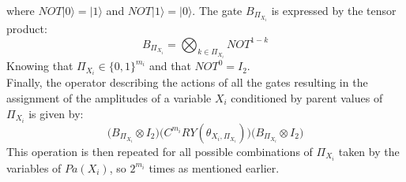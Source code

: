 where $NOT|0\rangle = |1\rangle$ and $NOT|1\rangle = |0\rangle$. 
The gate $B_{\Pi_{X_i}}$ is expressed by the tensor product:
\[B_{\Pi_{X_i}} = \bigotimes_{k \in \Pi_{X_i}} NOT^{1-k} \]
Knowing that $\Pi_{X_i} \in \{0,1\}^{m_i}$ and that $NOT^0 = I_2$. 
\\[5pt]
Finally, the operator describing the actions of all the gates resulting in the assignment of the amplitudes of a variable $X_i$ conditioned by parent values of $\Pi_{X_i}$ is given by: 
\[
\big(B_{\Pi_{X_i}} \!\! \otimes I_2 \big)
\big(C^{m_i}RY(\theta_{X_i, \Pi_{X_i}})\big)
\big(B_{\Pi_{X_i}} \!\! \otimes I_2 \big)
\]
This operation is then repeated for all possible combinations of $\Pi_{X_i}$ taken by the variables of $Pa(X_i)$, so $2^{m_i}$ times as mentioned earlier.

\vspace{20pt}

